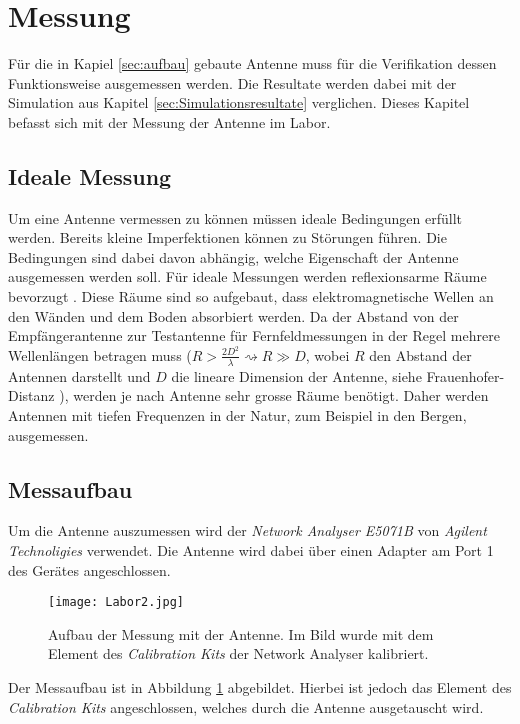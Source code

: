 \section{Messung}\label{sec:Messung}

Für die in Kapiel \ref{sec:aufbau} gebaute Antenne muss für die Verifikation dessen Funktionsweise ausgemessen werden. Die Resultate werden dabei mit der Simulation aus Kapitel \ref{sec:Simulationsresultate} verglichen. Dieses Kapitel befasst sich mit der Messung der Antenne im Labor.

\subsection{Ideale Messung}

Um eine Antenne vermessen zu können müssen ideale Bedingungen erfüllt werden. Bereits kleine Imperfektionen können zu Störungen führen. Die Bedingungen sind dabei davon abhängig, welche Eigenschaft der Antenne ausgemessen werden soll.
Für ideale Messungen werden reflexionsarme Räume bevorzugt \cite{ranges}. Diese Räume sind so aufgebaut, dass elektromagnetische Wellen an den Wänden und dem Boden absorbiert werden. Da der Abstand von der Empfängerantenne zur Testantenne für Fernfeldmessungen in der Regel mehrere Wellenlängen betragen muss ($R > \frac{2D^2}{\lambda} \rightsquigarrow R \gg D$, wobei $R$ den Abstand der Antennen darstellt und $D$ die lineare Dimension der Antenne, siehe Frauenhofer-Distanz \cite{frauenhofer}), werden je nach Antenne sehr grosse Räume benötigt. Daher werden Antennen mit tiefen Frequenzen in der Natur, zum Beispiel in den Bergen, ausgemessen.

\subsection{Messaufbau}

Um die Antenne auszumessen wird der \textit{Network Analyser E5071B} von \textit{Agilent Technoligies} verwendet. Die Antenne wird dabei über einen Adapter am Port 1 des Gerätes angeschlossen.

\begin{figure}[h!]
	\centering
	\texttt{[image: Labor2.jpg]}
	\caption{Aufbau der Messung mit der Antenne. Im Bild wurde mit dem Element des \textit{Calibration Kits} der Network Analyser kalibriert.}
	\label{fig:Messung_Labor}
\end{figure}

Der Messaufbau ist in Abbildung \ref{fig:Messung_Labor} abgebildet. Hierbei ist jedoch das Element des \textit{Calibration Kits} angeschlossen, welches durch die Antenne ausgetauscht wird.

